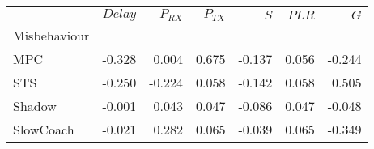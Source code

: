 \begin{tabular}{lrrrrrr}
\toprule
{} &  $Delay$ &  $P_{RX}$ &  $P_{TX}$ &    $S$ &  $PLR$ &    $G$ \\
Misbehaviour &          &           &           &        &        &        \\
\midrule
MPC          &   -0.328 &     0.004 &     0.675 & -0.137 &  0.056 & -0.244 \\
STS          &   -0.250 &    -0.224 &     0.058 & -0.142 &  0.058 &  0.505 \\
Shadow       &   -0.001 &     0.043 &     0.047 & -0.086 &  0.047 & -0.048 \\
SlowCoach    &   -0.021 &     0.282 &     0.065 & -0.039 &  0.065 & -0.349 \\
\bottomrule
\end{tabular}
